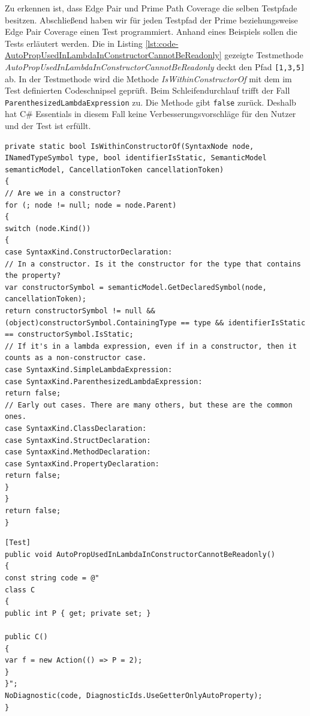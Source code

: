 \vspace{1ex}
Zu erkennen ist, dass Edge Pair und Prime Path Coverage die selben Testpfade besitzen. Abschließend haben wir für jeden Testpfad der Prime beziehungsweise Edge Pair Coverage einen Test programmiert. Anhand eines Beispiels sollen die Tests erläutert werden. Die in Listing \ref{lst:code-AutoPropUsedInLambdaInConstructorCannotBeReadonly} gezeigte Testmethode \textit{AutoPropUsedInLambdaInConstructorCannotBeReadonly} deckt den Pfad \texttt{[1,3,5]} ab. In der Testmethode wird die Methode \textit{IsWithinConstructorOf} mit dem im Test definierten Codeschnipsel geprüft. Beim Schleifendurchlauf trifft der Fall \texttt{ParenthesizedLambdaExpression} zu. Die Methode gibt \texttt{false} zurück. Deshalb hat C\# Essentials in diesem Fall keine Verbesserungsvorschläge für den Nutzer und der Test ist erfüllt.
\begin{lstlisting}[caption={Mehtode \textit{IsWithinConstructorOf}},
label=lst:code-IsWithinConstructorOf]
private static bool IsWithinConstructorOf(SyntaxNode node, INamedTypeSymbol type, bool identifierIsStatic, SemanticModel semanticModel, CancellationToken cancellationToken)
{
// Are we in a constructor?
for (; node != null; node = node.Parent)
{
switch (node.Kind())
{
case SyntaxKind.ConstructorDeclaration:
// In a constructor. Is it the constructor for the type that contains the property?
var constructorSymbol = semanticModel.GetDeclaredSymbol(node, cancellationToken);
return constructorSymbol != null && (object)constructorSymbol.ContainingType == type && identifierIsStatic == constructorSymbol.IsStatic;
// If it's in a lambda expression, even if in a constructor, then it counts as a non-constructor case.
case SyntaxKind.SimpleLambdaExpression:
case SyntaxKind.ParenthesizedLambdaExpression:
return false;
// Early out cases. There are many others, but these are the common ones.
case SyntaxKind.ClassDeclaration:
case SyntaxKind.StructDeclaration:
case SyntaxKind.MethodDeclaration:
case SyntaxKind.PropertyDeclaration:
return false;
}
}
return false;
}
\end{lstlisting}
\begin{lstlisting}[caption={Mehtode \textit{AutoPropUsedInLambdaInConstructorCannotBeReadonly}},
label=lst:code-AutoPropUsedInLambdaInConstructorCannotBeReadonly]
[Test]
public void AutoPropUsedInLambdaInConstructorCannotBeReadonly()
{
const string code = @"
class C
{
public int P { get; private set; }

public C()
{
var f = new Action(() => P = 2);
}
}";
NoDiagnostic(code, DiagnosticIds.UseGetterOnlyAutoProperty);
}
\end{lstlisting}
